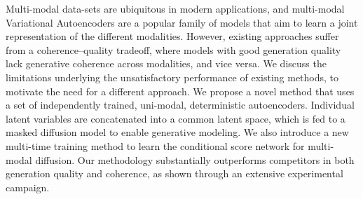 Multi-modal data-sets are ubiquitous in modern applications, and multi-modal Variational Autoencoders are a popular family of models that aim to learn a joint representation of the different modalities. However, existing approaches suffer from a coherence--quality tradeoff, where models with good generation quality lack generative coherence across modalities, and vice versa. We discuss the limitations underlying the unsatisfactory performance of existing methods, to motivate the need for a different approach. We propose a novel method that uses a set of independently trained, uni-modal, deterministic autoencoders. Individual latent variables are concatenated into a common latent space, which is fed to a masked diffusion model to enable generative modeling. We also introduce a new multi-time training method to learn the conditional score network for multi-modal diffusion. Our methodology substantially outperforms competitors in both generation quality and coherence, as shown through an extensive experimental campaign. 
